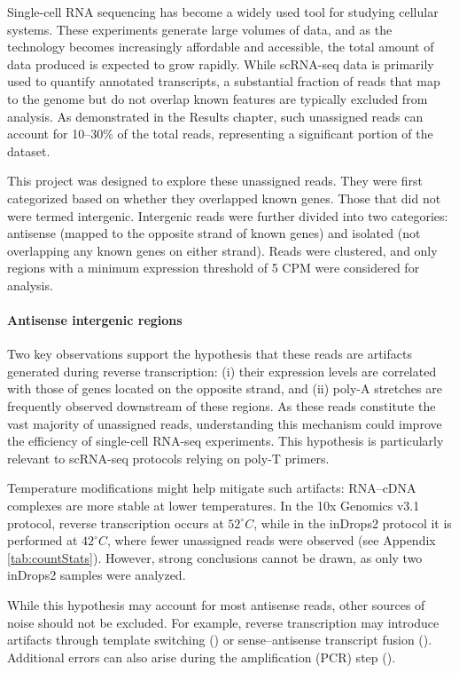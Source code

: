 Single-cell RNA sequencing has become a widely used tool for studying cellular systems.
These experiments generate large volumes of data, and as the technology becomes increasingly affordable and accessible,
the total amount of data produced is expected to grow rapidly.
While scRNA-seq data is primarily used to quantify annotated transcripts,
a substantial fraction of reads that map to the genome but do not overlap known features are typically excluded from analysis.
As demonstrated in the Results chapter,
such unassigned reads can account for 10–30\% of the total reads, representing a significant portion of the dataset.

This project was designed to explore these unassigned reads.
They were first categorized based on whether they overlapped known genes.
Those that did not were termed intergenic.
Intergenic reads were further divided into two categories:
antisense (mapped to the opposite strand of known genes) and isolated (not overlapping any known genes on either strand).
Reads were clustered, and only regions with a minimum expression threshold of 5 CPM were considered for analysis.

\paragraph{Antisense intergenic regions}

Two key observations support the hypothesis that these reads are artifacts generated during reverse transcription:
(i) their expression levels are correlated with those of genes located on the opposite strand, and
(ii) poly-A stretches are frequently observed downstream of these regions.
As these reads constitute the vast majority of unassigned reads,
understanding this mechanism could improve the efficiency of single-cell RNA-seq experiments.
This hypothesis is particularly relevant to scRNA-seq protocols relying on poly-T primers.

Temperature modifications might help mitigate such artifacts: RNA–cDNA complexes are more stable at lower temperatures.
In the 10x Genomics v3.1 protocol, reverse transcription occurs at $52^\circ C$,
while in the inDrops2 protocol it is performed at $42^\circ C$,
where fewer unassigned reads were observed (see Appendix \ref{tab:countStats}).
However, strong conclusions cannot be drawn, as only two inDrops2 samples were analyzed.

While this hypothesis may account for most antisense reads, other sources of noise should not be excluded.
For example, reverse transcription may introduce artifacts through template switching (\cite{Bal2019})
or sense–antisense transcript fusion (\cite{Houseley2010}).
Additional errors can also arise during the amplification (PCR) step (\cite{Potapov2017}).

